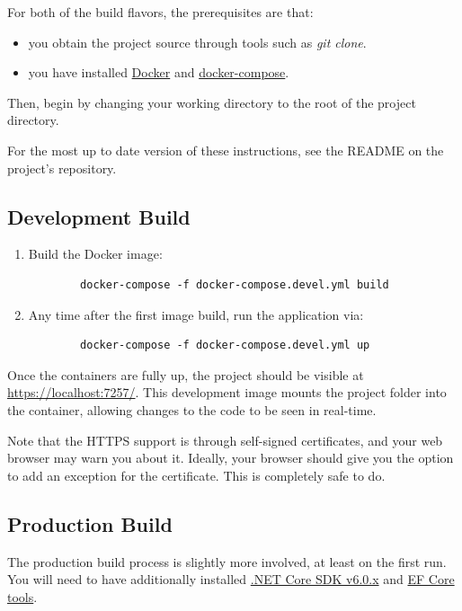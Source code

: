\documentclass[a4paper, 12pt, titlepage]{article}
\begin{document}
  For both of the build flavors, the prerequisites are that:
  \begin{itemize}
    \item you obtain the project source through tools such as \textit{git clone}.
    \item you have installed \href{https://docs.docker.com/get-docker/}{Docker}
      and \href{https://docs.docker.com/compose/install/}{docker-compose}.
  \end{itemize}
  
  Then, begin by changing your working directory to the root of the project directory.
  
  For the most up to date version of these instructions, see the README on the project's repository.
  
  \subsection{Development Build}
  
  \begin{enumerate}
    \item Build the Docker image:
      \begin{verbatim}
        docker-compose -f docker-compose.devel.yml build
      \end{verbatim}
    \item Any time after the first image build, run the application via:
      \begin{verbatim}
        docker-compose -f docker-compose.devel.yml up
      \end{verbatim}
  \end{enumerate}
  
  Once the containers are fully up, the project should be visible at \url{https://localhost:7257/}. 
  This development image mounts the project folder into the container, allowing changes to the code to be seen in real-time.
  
  Note that the HTTPS support is through self-signed certificates, and your web browser may warn you about it.
  Ideally, your browser should give you the option to add an exception for the certificate.
  This is completely safe to do.
  
  \pagebreak
  \subsection{Production Build}
  
  The production build process is slightly more involved, at least on the first run.
  You will need to have additionally installed
  \href{https://dotnet.microsoft.com/en-us/download/dotnet/6.0}{.NET Core SDK v6.0.x} and
  \href{https://docs.microsoft.com/en-us/ef/core/cli/dotnet\#installing-the-tools}{EF Core tools}.
  
\end{document}
